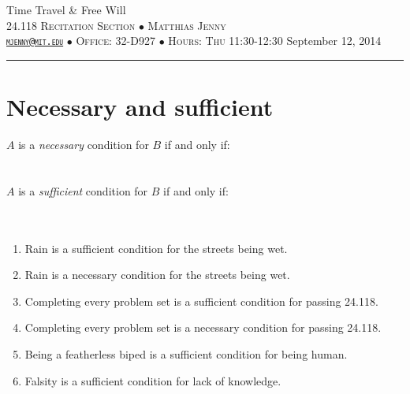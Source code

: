 \documentclass[justified]{tufte-handout}
\newcommand{\HRule}{\rule{\linewidth}{0.1mm}}
\begin{document}
\begin{fullwidth}
\noindent\LARGE Time Travel \& Free Will \normalsize \\[.3cm]
\noindent  \textsc{24.118 Recitation Section $\bullet$ Matthias Jenny\\  {\texttt{\href{mailto:mjenny@mit.edu}{mjenny@mit.edu}}} $\bullet$ Office:  32-D927 $\bullet$ Hours: Thu 11:30-12:30} \hfill{September 12, 2014}
\noindent\HRule
\end{fullwidth}

\section{Necessary and sufficient}

$A$ is a \emph{necessary} condition for $B$ if and only if:  \underline{\hspace{4.3cm}}\\\\\underline{\hspace{11.23cm}}\\

\noindent $A$ is a \emph{sufficient} condition for $B$ if and only if:  \underline{\hspace{4.35cm}}\\\\\underline{\hspace{11.23cm}}\\

\begin{enumerate}
\item Rain is a sufficient condition for the streets being wet.
\item Rain is a necessary condition for the streets being wet.
\item Completing every problem set is a sufficient condition for passing 24.118.
\item Completing every problem set is a necessary condition for passing 24.118.
\item Being a featherless biped is a sufficient condition for being human.
\item Falsity is a sufficient condition for lack of knowledge.
\end{enumerate}
\end{document}
